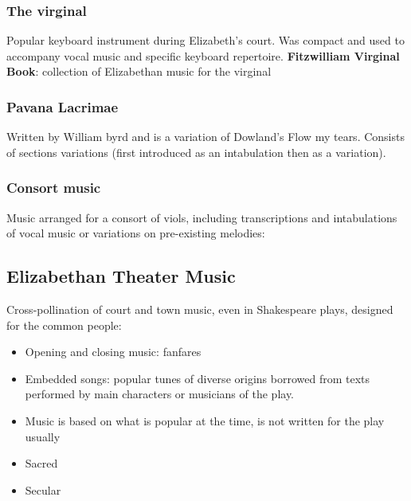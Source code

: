 \documentclass{article}
\begin{document}
  \subsubsection{The virginal}
  Popular keyboard instrument during Elizabeth's court. Was compact and used to accompany vocal music and specific keyboard repertoire. \textbf{Fitzwilliam Virginal Book}: collection of Elizabethan music for the virginal
  \subsubsection{Pavana Lacrimae}
  Written by William byrd and is a variation of Dowland's Flow my tears. Consists of sections variations (first introduced as an intabulation then as a variation).
  \subsubsection{Consort music}
  Music arranged for a consort of viols, including transcriptions and intabulations of vocal music or variations on pre-existing melodies:
  \subsection{Elizabethan Theater Music}
  Cross-pollination of court and town music, even in Shakespeare plays, designed for the common people:
  \begin{itemize}
    \item Opening and closing music: fanfares
    \item Embedded songs: popular tunes of diverse origins borrowed from texts performed by main characters or musicians of the play.
    \item Music is based on what is popular at the time, is not written for the play usually
  \end{itemize}
  \begin{itemize}
    \item Sacred
    \item Secular
  \end{itemize}
 
\end{document}
